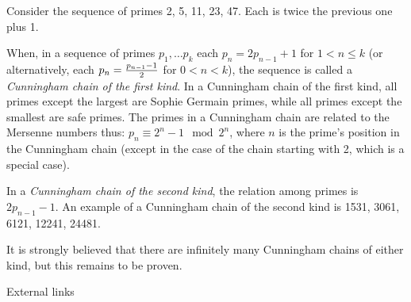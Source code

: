 \documentclass[12pt]{article}
\begin{document}
Consider the sequence of primes 2, 5, 11, 23, 47. Each is twice the previous one plus 1.

When, in a sequence of primes $p_1, \ldots p_k$ each $p_n = 2p_{n - 1} + 1$ for $1 < n \le k$ (or alternatively, each $p_n = {{p_{n - 1} - 1} \over 2}$ for $0 < n < k$), the sequence is called a {\em Cunningham chain of the first kind}. In a Cunningham chain of the first kind, all primes except the largest are Sophie Germain primes, while all primes except the smallest are safe primes. The primes in a Cunningham chain are related to the Mersenne numbers thus: $p_n \equiv 2^n - 1 \mod 2^n$, where $n$ is the prime's position in the Cunningham chain (except in the case of the chain starting with 2, which is a special case).

In a {\em Cunningham chain of the second kind}, the relation among primes is $2p_{n - 1} - 1$. An example of a Cunningham chain of the second kind is 1531, 3061, 6121, 12241, 24481.

It is strongly believed that there are infinitely many Cunningham chains of either kind, but this remains to be proven.

External links

\end{document}
